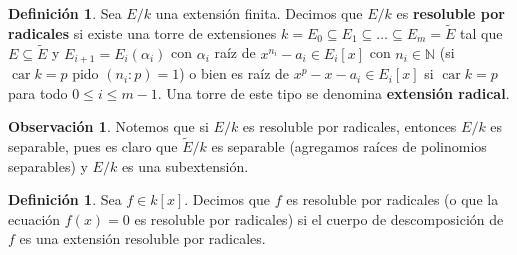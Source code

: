 \documentclass[12pt]{book}
\theoremstyle{definition}
\newtheorem{obs}[teo]{Observación}
\newtheorem{defn}[teo]{Definición}
\newcommand{\NN}{\mathbb{N}}
\DeclareMathOperator{\car}{car}
\begin{document}
\begin{defn}
Sea $E/k$ una extensión finita. Decimos que $E/k$ es \textbf{resoluble por radicales} si existe una torre de extensiones $k=E_0\subseteq E_1\subseteq \ldots \subseteq E_m=\widetilde{E}$ tal que $E\subseteq\widetilde{E}$ y $E_{i+1}=E_i(\alpha_i)$ con $\alpha_i$ raíz de $x^{n_i}-a_i\in E_i[x]$ con $n_i\in\NN$ (si $\car k=p$ pido $(n_i:p)=1$) o bien es raíz de $x^p - x - a_i\in E_i[x]$ si $\car k = p$ para todo $0\leq i\leq m-1$. Una torre de este tipo se denomina \textbf{extensión radical}.
\end{defn}

\begin{obs}
Notemos que si $E/k$ es resoluble por radicales, entonces $E/k$ es separable, pues es claro que $\widetilde{E}/k$ es separable (agregamos raíces de polinomios separables) y $E/k$ es una subextensión.
\end{obs}

\begin{defn}
Sea $f\in k[x]$. Decimos que $f$ es resoluble por radicales (o que la ecuación $f(x)=0$ es resoluble por radicales) si el cuerpo de descomposición de $f$ es una extensión resoluble por radicales.
\end{defn}
\end{document}
